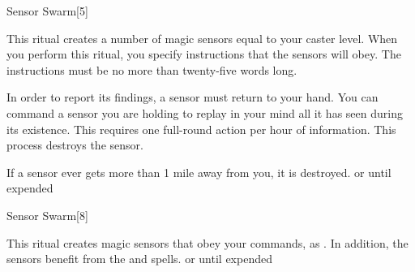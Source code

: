 \begin{spellsection}{Sensor Swarm}[5]
    \begin{spellheader}
    \end{spellheader}
    \begin{spellcontent}
        \begin{spelltargetinginfo}
        \end{spelltargetinginfo}
        \begin{spelleffects}

            \spellline
            \spelleffect This ritual creates a number of magic sensors equal to your caster level. When you perform this ritual, you specify instructions that the sensors will obey. The instructions must be no more than twenty-five words long.

            \par In order to report its findings, a sensor must return to your hand. You can command a sensor you are holding to replay in your mind all it has seen during its existence. This requires one full-round action per hour of information. This process destroys the sensor.

            \par If a sensor ever gets more than 1 mile away from you, it is destroyed.
            \spelldur \durext or until expended \dismissable
        \end{spelleffects}
    \end{spellcontent}
    \begin{spellfooter}
        \spellnotes {}
    \end{spellfooter}
\end{spellsection}

\begin{spellsection}[Greater]{Sensor Swarm}[8]
    \begin{spellheader}
    \end{spellheader}
    \begin{spellcontent}
        \begin{spelltargetinginfo}
        \end{spelltargetinginfo}
        \begin{spelleffects}

            \spellline
            \spelleffect This ritual creates magic sensors that obey your commands, as . In addition, the sensors benefit from the  and  spells.
            \spelldur \durext or until expended \dismissable
        \end{spelleffects}
    \end{spellcontent}
    \begin{spellfooter}
    \end{spellfooter}
\end{spellsection}

